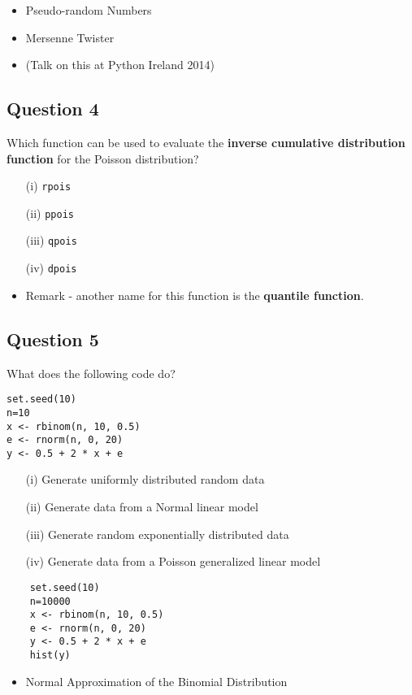 \documentclass[11pt]{article} %
\begin{document}
\begin{itemize}
\item Pseudo-random Numbers
\item Mersenne Twister
\item (Talk on this at Python Ireland 2014)
\end{itemize}
\newpage
\subsection*{Question 4}
Which function can be used to evaluate the \textbf{inverse cumulative distribution function} for the Poisson distribution?

\begin{itemize}
\item[(i)] \texttt{rpois}
\item[(ii)] \texttt{ppois}
\item[(iii)] \texttt{qpois}
\item[(iv)] \texttt{dpois}
\end{itemize}
\bigskip
\begin{itemize}
\item Remark - another name for this function is the \textbf{quantile function}.
\end{itemize}
\newpage
\subsection*{Question 5}
What does the following code do?
\begin{framed}
\begin{verbatim}
set.seed(10)
n=10
x <- rbinom(n, 10, 0.5)
e <- rnorm(n, 0, 20)
y <- 0.5 + 2 * x + e
\end{verbatim}
\end{framed}
\begin{itemize}
\item[(i)] Generate uniformly distributed random data
\item[(ii)] Generate data from a Normal linear model
\item[(iii)] Generate random exponentially distributed data
\item[(iv)] Generate data from a Poisson generalized linear model
\end{itemize}
\bigskip
\begin{framed}
	\begin{verbatim}
	set.seed(10)
	n=10000
	x <- rbinom(n, 10, 0.5)
	e <- rnorm(n, 0, 20)
	y <- 0.5 + 2 * x + e
	hist(y)
	\end{verbatim}
\end{framed}
\begin{itemize}
\item Normal Approximation of the Binomial Distribution
\end{itemize}
\newpage
\end{document}
